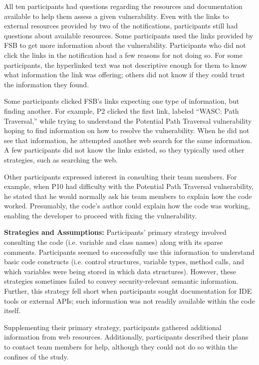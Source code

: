 \documentclass[10pt,journal,compsoc]{IEEEtran}
\begin{document}
All ten participants had questions regarding the resources and documentation available to help them assess a given vulnerability. 
Even with the links to external resources provided by two of the notifications, participants still had questions about available resources. 
Some participants used the links provided by FSB to get more information about the vulnerability.
Participants who did not click the links in the notification had a few reasons for not doing so.
For some participants, the hyperlinked text was not descriptive enough for them to know what information the link was offering; others did not know if they could trust the information they found.

Some participants clicked FSB's links expecting one type of information, but finding another. 
For example, P2 clicked the first link, labeled ``WASC: Path Traversal,'' while trying to understand the Potential Path Traversal vulnerability hoping to find information on how to resolve the vulnerability.
When he did not see that information, he attempted another web search for the same information. 
A few participants did not know the links existed, so they typically used other strategies, such as searching the web.

Other participants expressed interest in consulting their team members. 
For example, when P10 had difficulty with the Potential Path Traversal vulnerability, he stated that he would normally ask his team members to explain how the code worked.
Presumably, the code's author could explain how the code was working, enabling the developer to proceed with fixing the vulnerability.


\textbf{Strategies and Assumptions:}
Participants' primary strategy involved consulting the code (i.e. variable and class names) along with its sparse comments.
Participants seemed to successfully use this information to understand basic code constructs (i.e. control structures, variable types, method calls, and which variables were being stored in which data structures).
However, these strategies sometimes failed to convey security-relevant semantic information.
Further, this strategy fell short when participants sought documentation for IDE tools or external APIs; such information was not readily available within the code itself. 

Supplementing their primary strategy, participants gathered additional information from web resources.
Additionally, participants described their plans to contact team members for help, although they could not do so within the confines of the study.
\end{document}
